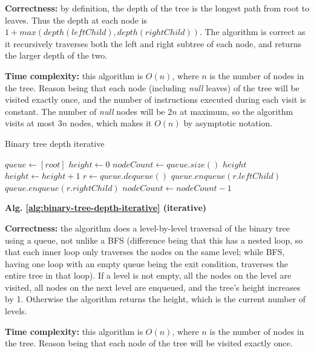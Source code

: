 \documentclass{article}
\begin{document}
\begin{description}
  \textbf{Correctness:} by definition, the depth of the tree is the longest path from root to leaves. Thus the depth at each node is $1 + max(depth(leftChild), depth(rightChild))$. The algorithm is correct as it recursively traverses both the left and right subtree of each node, and returns the larger depth of the two.

  \textbf{Time complexity:} this algorithm is $O(n)$, where $n$ is the number of nodes in the tree. Reason being that each node (including \textit{null} leaves) of the tree will be visited exactly once, and the number of instructions executed during each visit is constant. The number of \textit{null} nodes will be $2n$ at maximum, so the algorithm visits at most $3n$ nodes, which makes it $O(n)$ by asymptotic notation.

  \begin{algorithm}[h]
  \caption{Binary tree depth iterative}
  \label{alg:binary-tree-depth-iterative}
    \begin{algorithmic}[1]
      \State $queue \gets [root]$
      \State $height \gets 0$
        \State $nodeCount \gets queue.size()$
          \State \Return $height$
        \EndIf
        \State $height \gets height + 1$
          \State $r \gets queue.dequeue()$
             \State $queue.enqueue(r.leftChild)$
          \EndIf
             \State $queue.enqueue(r.rightChild)$
          \EndIf
          \State $nodeCount \gets nodeCount - 1$
        \EndWhile
      \EndWhile
    \EndFunction
    \end{algorithmic}
  \end{algorithm}

  \textbf{Alg. \ref{alg:binary-tree-depth-iterative} (iterative)}

  \textbf{Correctness:} the algorithm does a level-by-level traversal of the binary tree using a queue, not unlike a BFS (difference being that this has a nested loop, so that each inner loop only traverses the nodes on the same level; while BFS, having one loop with an empty queue being the exit condition, traverses the entire tree in that loop). If a level is not empty, all the nodes on the level are visited, all nodes on the next level are enqueued, and the tree's height increases by 1. Otherwise the algorithm returns the height, which is the current number of levels.

  \textbf{Time complexity:} this algorithm is $O(n)$, where $n$ is the number of nodes in the tree. Reason being that each node of the tree will be visited exactly once.


\end{description}
\end{document}
